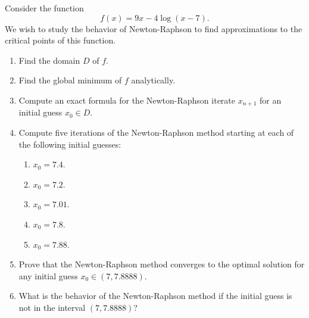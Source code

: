 \begin{problem}\cite[lec3\_newton\_mthd, 3.1]{Freund2004nonlinear}
Consider the function 
\begin{equation*}
f(x) = 9x -4\log(x-7).
\end{equation*}
We wish to study the behavior of Newton-Raphson to find approximations to the critical points of this function.
\begin{enumerate}
	\item Find the domain $D$ of $f$.
	\item Find the global minimum of $f$ analytically.
	\item Compute an exact formula for the Newton-Raphson iterate $x_{n+1}$ for an initial guess $x_0 \in D$.
	\item Compute five iterations of the Newton-Raphson method starting at each of the following initial guesses:
	\begin{enumerate}
		\item $x_0 = 7.4$.
		\item $x_0 = 7.2$.
		\item $x_0 = 7.01$.
		\item $x_0 = 7.8$.
		\item $x_0 = 7.88$.
	\end{enumerate}
	\item Prove that the Newton-Raphson method converges to the optimal solution for any initial guess $x_0 \in (7,7.8888)$.
	\item What is the behavior of the Newton-Raphson method if the initial guess is not in the interval $(7,7.8888)$?
\end{enumerate}
\end{problem}


